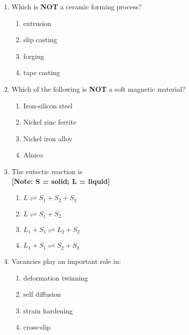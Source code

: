 \documentclass[article]{IEEEtran}
\numberwithin{figure}{enumi}
\begin{document}
\begin{enumerate}
\item    Which is \textbf{NOT} a ceramic forming process?
    \begin{enumerate}
        \item extrusion
        \item slip casting
        \item forging
        \item tape casting
    \end{enumerate}
   
\item    Which of the following is \textbf{NOT} a soft magnetic material?
    \begin{enumerate}
        \item Iron-silicon steel
        \item Nickel zinc ferrite
        \item Nickel iron alloy
        \item Alnico
    \end{enumerate}
    
 \item The eutectic reaction is \\
    \textbf{[Note: S = solid; L = liquid]}
    \begin{enumerate}
        \item $L \rightleftharpoons S_1 + S_2 + S_3$
        \item $L \rightleftharpoons S_1 + S_2$
        \item $L_1 + S_1 \rightleftharpoons L_2 + S_2$
        \item $L_1 + S_1 \rightleftharpoons S_2 + S_3$
    \end{enumerate}
  
  \item  Vacancies play an important role in:
    \begin{enumerate}
        \item deformation twinning
        \item self diffusion
        \item strain hardening
        \item cross-slip
    \end{enumerate}
   
\end{enumerate}
\end{document}
